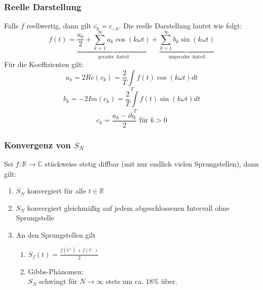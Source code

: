 \documentclass[a4paper,twocolumn,10pt]{article}
\begin{document}
\subsubsection{Reelle Darstellung}
Falls $f$ reellwertig, dann gilt $\overline{c_k}=c_{-k}$.
Die reelle Darstellung lautet wie folgt:
\begin{equation*}
f(t)=\underbrace{\frac{a_0}{2}+\sum\limits_{k=1}^{\infty}a_k\cos(k\omega t)}_{\text{gerader Anteil}}+\underbrace{\sum\limits_{k=1}^{\infty}b_k\sin(k\omega t)}_{\text{ungerader Anteil}}
\end{equation*}
Für die Koeffizienten gilt:
\begin{equation*}
a_k=2Re(c_k)=\frac{2}{T}\int\limits_{T}f(t)\cos(k\omega t)dt
\end{equation*}
\begin{equation*}
b_k=-2Im(c_k)=\frac{2}{T}\int\limits_{T}f(t)\sin(k\omega t)dt
\end{equation*}
\begin{equation*}
c_k=\frac{a_k-ib_k}{2}\text{ für }k>0
\end{equation*}

\subsubsection{Konvergenz von $S_N$}
Sei $f:\mathbb{R}\rightarrow\mathbb{C}$ stückweise stetig diffbar (mit nur endlich vielen Sprungstellen), dann gilt:
\begin{enumerate}[label=$\bullet$]
\item $S_N$ konvergiert für alle $t\in\mathbb{R}$
\item $S_N$ konvergiert gleichmäßig auf jedem abgeschlossenen Intervall ohne Sprungstelle
\item An den Sprungstellen gilt
\begin{enumerate}[label=$\bullet$]
\item $S_f(t)=\frac{f(t^+)+f(t^-)}{2}$
\item Gibbs-Phänomen:\\
$S_N$ schwingt für $N\rightarrow\infty$ stets um ca. $18 \%$ über.
\end{enumerate}
\end{enumerate}
\end{document}
